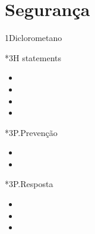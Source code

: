 \part{Segurança}

\begin{sectionBox}1{Diclorometano}

    \begin{multicols}{2}

        \begin{sectionBox}{}
            \begin{multicols}{3}
            \end{multicols}
        \end{sectionBox}

        \begin{sectionBox}*3{H statements}
            \begin{itemize}
                \item {}
                \item {}
                \item {}
                \item {}
            \end{itemize}
        \end{sectionBox}

        \begin{sectionBox}*3{P.Prevenção}
            \begin{itemize}
                \item {}
                \item {}
            \end{itemize}
        \end{sectionBox}

        \begin{sectionBox}*3{P.Resposta}
            \begin{itemize}
                \item {}
                \item {}
                \item {}
            \end{itemize}
        \end{sectionBox}

    \end{multicols}

\end{sectionBox}










